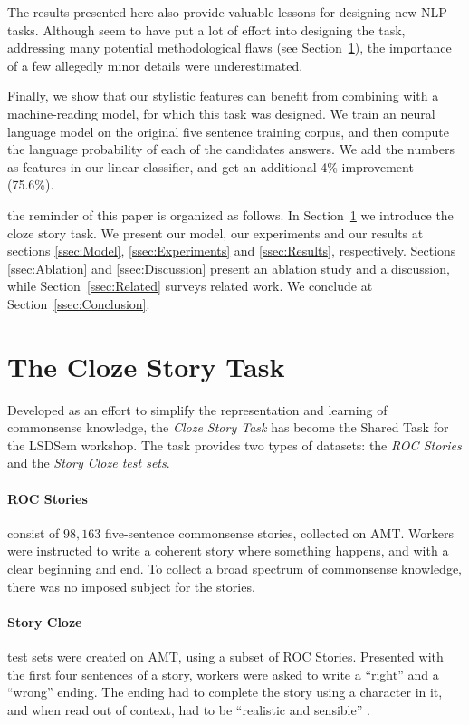 \documentclass[11pt,a4paper]{article}
\newcommand{\secref}[1]{Section~\ref{ssec:#1}}
\newcommand{\isection}[2]{\section{#1}\label{ssec:#2}}
\begin{document}
The results presented here also provide valuable lessons for designing new NLP tasks.
Although \cite{Mostafazadeh:2016} seem to have put a lot of effort into designing the task, 
addressing many potential methodological flaws (see \secref{ROC_Story}), the importance of a few allegedly minor details were underestimated. 

Finally, we show that our stylistic features can benefit from combining with a machine-reading model, for which this task was designed.
We train an neural language model on the original five sentence training corpus, and then compute the language probability of each of the candidates answers. 
We add the numbers as features in our linear classifier, and get an additional 4\% improvement (75.6\%).

the reminder of this paper is organized as follows. In \secref{ROC_Story} we introduce the cloze story task.
We present our model, our experiments and our results at sections \ref{ssec:Model}, \ref{ssec:Experiments} and \ref{ssec:Results}, respectively.
Sections \ref{ssec:Ablation} and \ref{ssec:Discussion} present an ablation study and a discussion, while \secref{Related}  surveys related work. 
We conclude at \secref{Conclusion}.

\isection{The Cloze Story Task}{ROC_Story}
Developed as an effort to simplify the representation and learning of commonsense knowledge, the \textit{Cloze Story Task} \cite{Mostafazadeh:2016} has become the Shared Task for the LSDSem workshop. %
The task provides two types of datasets: the \textit{ROC Stories} and the \textit{Story Cloze test sets}.

\paragraph{ROC Stories}
consist of $98,163$ five-sentence commonsense stories, collected on AMT. Workers were instructed to write a coherent story where something happens, and with a clear beginning and end. To collect a broad spectrum of commonsense knowledge, there was no imposed subject for the stories.
\paragraph{Story Cloze} test sets were created on AMT, using a subset of ROC Stories. Presented with the first four sentences of a story, workers were asked to write a ``right'' and a ``wrong'' ending. The ending had to complete the story using a character in it, and when read out of context, had to be ``realistic and sensible'' \cite{Mostafazadeh:2016}.
\end{document}

